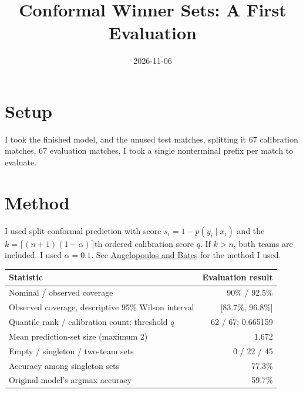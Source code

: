 \documentclass[10pt]{article}
\title{Conformal Winner Sets: A First Evaluation}
\author{}\date{2026-11-06}
\begin{document}
\maketitle
\vspace{-2em}

\section{Setup}

I took the finished model, and the unused test matches, splitting it 67 calibration matches, 67 evaluation matches. I took a single nonterminal prefix per match to evaluate.

\section{Method}

I used split conformal prediction with score $s_i=1-p(y_i\mid x_i)$ and the $k=\lceil(n+1)(1-\alpha)\rceil$th ordered calibration score $q$. If $k>n$, both teams are included.
I used $\alpha = 0.1$. See \href{https://arxiv.org/abs/2107.07511}{Angelopoulos and Bates} for the method I used. 

\begin{center}\small
\begin{tabularx}{0.95\linewidth}{Xr}
\toprule
Statistic & Evaluation result \\
\midrule
Nominal / observed coverage & 90\% / 92.5\% \\
Observed coverage, descriptive 95\% Wilson interval & [83.7\%, 96.8\%] \\
Quantile rank / calibration count; threshold $q$ & 62 / 67; 0.665159 \\
Mean prediction-set size (maximum 2) & 1.672 \\
Empty / singleton / two-team sets & 0 / 22 / 45 \\
Accuracy among singleton sets & 77.3\% \\
Original model's argmax accuracy & 59.7\% \\
\bottomrule
\end{tabularx}\end{center}
\end{document}
